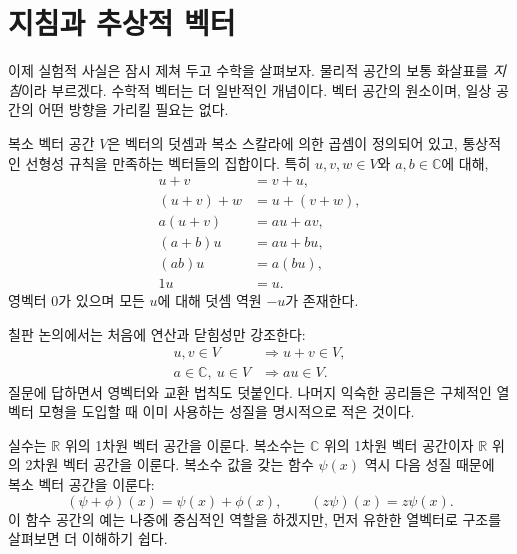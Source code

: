 \section{지침과 추상적 벡터}

이제 실험적 사실은 잠시 제쳐 두고 수학을 살펴보자. 물리적 공간의 보통 화살표를 \emph{지침}이라 부르겠다. 수학적 벡터는 더 일반적인 개념이다. 벡터 공간의 원소이며, 일상 공간의 어떤 방향을 가리킬 필요는 없다.

\begin{definition}
복소 벡터 공간 \(V\)은 벡터의 덧셈과 복소 스칼라에 의한 곱셈이 정의되어 있고, 통상적인 선형성 규칙을 만족하는 벡터들의 집합이다. 특히 \(u,v,w\in V\)와 \(a,b\in\mathbb C\)에 대해,
\begin{align}
  u+v&=v+u,\\
  (u+v)+w&=u+(v+w),\\
  a(u+v)&=au+av,\\
  (a+b)u&=au+bu,\\
  (ab)u&=a(bu),\\
  1u&=u.
\end{align}
영벡터 \(0\)가 있으며 모든 \(u\)에 대해 덧셈 역원 \(-u\)가 존재한다.
\end{definition}

칠판 논의에서는 처음에 연산과 닫힘성만 강조한다:
\begin{equation}
\begin{aligned}
  u,v\in V&\Longrightarrow u+v\in V,\\
  a\in\mathbb C,\ u\in V&\Longrightarrow au\in V.
\end{aligned}
\end{equation}
질문에 답하면서 영벡터와 교환 법칙도 덧붙인다. 나머지 익숙한 공리들은 구체적인 열벡터 모형을 도입할 때 이미 사용하는 성질을 명시적으로 적은 것이다.

실수는 \(\mathbb R\) 위의 1차원 벡터 공간을 이룬다. 복소수는 \(\mathbb C\) 위의 1차원 벡터 공간이자 \(\mathbb R\) 위의 2차원 벡터 공간을 이룬다. 복소수 값을 갖는 함수 \(\psi(x)\) 역시 다음 성질 때문에 복소 벡터 공간을 이룬다:
\begin{equation}
  (\psi+\phi)(x)=\psi(x)+\phi(x),
  \qquad
  (z\psi)(x)=z\psi(x).
\end{equation}
이 함수 공간의 예는 나중에 중심적인 역할을 하겠지만, 먼저 유한한 열벡터로 구조를 살펴보면 더 이해하기 쉽다.

\begin{classroomqa}
\end{classroomqa}

